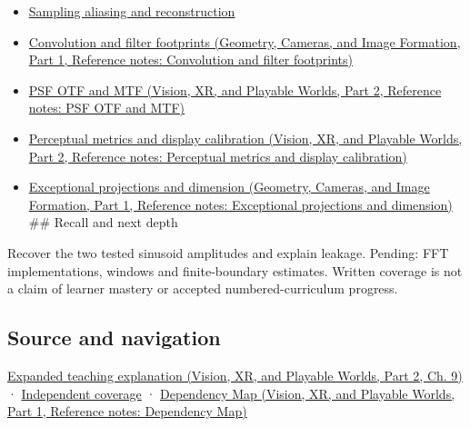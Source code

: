 \hypertarget{appendix-b60686ba06a1-used-by}{}

\begin{itemize}
\item
  \hyperref[appendix-6a7869dd79a6]{Sampling aliasing and reconstruction}
\item
  \href{../03-Geometry-Cameras-and-Image-Formation-P01/main.pdf\#nameddest=appendix-d5b3c692d9f0}{Convolution and filter footprints (Geometry, Cameras, and Image Formation, Part 1, Reference notes: Convolution and filter footprints)}
\item
  \href{../07-Vision-XR-and-Playable-Worlds-P02/main.pdf\#nameddest=appendix-8b76b0efd27f}{PSF OTF and MTF (Vision, XR, and Playable Worlds, Part 2, Reference notes: PSF OTF and MTF)}
\item
  \href{../07-Vision-XR-and-Playable-Worlds-P02/main.pdf\#nameddest=appendix-b2c1846508bf}{Perceptual metrics and display calibration (Vision, XR, and Playable Worlds, Part 2, Reference notes: Perceptual metrics and display calibration)}
\item
  \href{../03-Geometry-Cameras-and-Image-Formation-P01/main.pdf\#nameddest=appendix-3c73f7862157}{Exceptional projections and dimension (Geometry, Cameras, and Image Formation, Part 1, Reference notes: Exceptional projections and dimension)} \#\# Recall and next depth
\end{itemize}

Recover the two tested sinusoid amplitudes and explain leakage. Pending: FFT implementations, windows and finite-boundary estimates. Written coverage is not a claim of learner mastery or accepted numbered-curriculum progress.

\subsection{Source and navigation}\label{appendix-b60686ba06a1-source-and-navigation}

\hypertarget{appendix-b60686ba06a1-source-and-navigation}{}

\href{../07-Vision-XR-and-Playable-Worlds-P02/main.pdf\#nameddest=04-visual-computing-ii-ch042-fourier-coordinates-reveal-what-a-filter-removes}{Expanded teaching explanation (Vision, XR, and Playable Worlds, Part 2, Ch. 9)} · \hyperref[appendix-fd090d982a15-xr01---independent-seeing-and-representation-source]{Independent coverage} · \href{../07-Vision-XR-and-Playable-Worlds-P01/main.pdf\#nameddest=appendix-4ad47bdd269a}{Dependency Map (Vision, XR, and Playable Worlds, Part 1, Reference notes: Dependency Map)}

